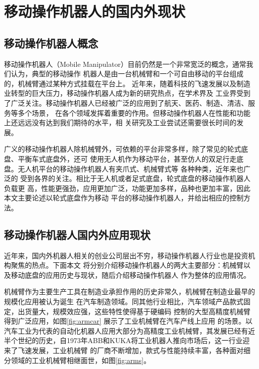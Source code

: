
\chapter{移动操作机器人的国内外现状}
\label{cha:intro}

\section{移动操作机器人概念}
\label{cha:base_comcept}

移动操作机器人（Mobile Manipulator）目前仍然是一个非常宽泛的概念，通常我们认为，典型的移动操作
机器人是由一台机械臂和一个可自由移动的平台组成的，机械臂通过某种方式挂载在平台上\cite{bostelman2016survey}。
近年来，随着科技的飞速发展以及制造业转型的巨大压力，移动操作机器人成为新的研究热点，在学术界及
工业界受到了广泛关注\cite{schneier2015literature}。移动操作机器人已经被广泛的应用到了航天\cite{ambrose2004mobile}、医药、制造\cite{guizzo2011meka}、清洁、服务等多个场景，
在各个领域发挥着重要的作用。但移动操作机器人在性能和功能上还远远没有达到我们期待的水平，相
关研究及工业尝试还需要很长时间的发展。

广义的移动操作机器人除机械臂外，可依赖的平台非常多样，除了常见的轮式底盘、平衡车式底盘外，还可
使用无人机作为移动平台，甚至仿人的双足行走底盘。无人机平台的移动操作机器人有夹爪式、机械臂式等
各种种类，近年来也广泛的
受到各界的关注\cite{ruggiero2018aerial}。相比于无人机或者足式底盘，轮式底盘的移动操作机器人负载更
高，性能更强劲，应用更加广泛，功能更加多样，品种也更加丰富，因此本文主要论述以轮式底盘作为移动
平台的移动操作机器人，并给出相应的控制方法。

\section{移动操作机器人国内外应用现状}
\label{cha:application}

近年来，国内外机器人相关的创业公司层出不穷，移动操作机器人行业也是投资机构聚焦的热点。下面本文
将分别介绍移动操作机器人的两大主要部分：机械臂以及移动底盘的应用历史与现状，随后介绍移动操作机器人
作为整体的应用情况。

机械臂作为主要生产工具在制造业承担作用的历史非常久，机械臂在制造业最早的规模化应用被认为诞生
在汽车制造领域。同其他行业相比，汽车领域产品款式固定，出货量大，规模效应强，这些特性使得基于硬编码
控制的大型高精度机械臂得到广泛应用，如图\ref{fig:armcar} 展示了工业机械臂在汽车产线上应用
的场景。以汽车工业为代表的自动化机器人应用大部分为高精度工业机械臂，其发展已经有近
半个世纪的历史，自1973年ABB和KUKA将工业机器人推向市场后，这一行业迎来了飞速发展，工业机械臂
的厂商不断增加，款式与性能持续丰富，各种面对细分领域的工业机械臂相继面世，如图\ref{fig:arms}。

